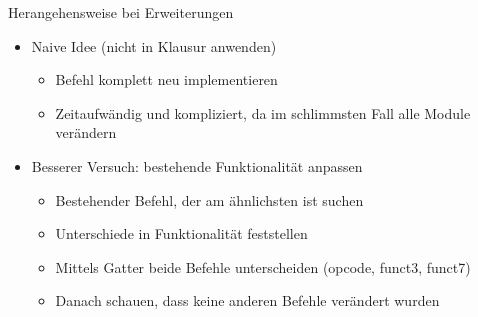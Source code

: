 \documentclass[
  german,            %
  aspectratio=169,    %
]{tumbeamer}
\begin{document}
\begin{frame}[c, fragile]{Herangehensweise bei Erweiterungen}{}
	\begin{itemize}
		\item Naive Idee (nicht in Klausur anwenden)
		\begin{itemize}
			\item Befehl komplett neu implementieren
			\item Zeitaufwändig und kompliziert, da im schlimmsten Fall alle Module verändern
		\end{itemize}
		\item Besserer Versuch: bestehende Funktionalität anpassen
		\begin{itemize}
			\item Bestehender Befehl, der am ähnlichsten ist suchen
			\item Unterschiede in Funktionalität feststellen
			\item Mittels Gatter beide Befehle unterscheiden (opcode, funct3, funct7)
			\item Danach schauen, dass keine anderen Befehle verändert wurden	
		\end{itemize}
	\end{itemize}
\end{frame}
\end{document}
